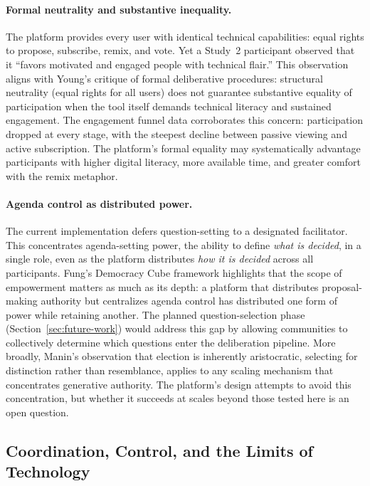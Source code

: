 \documentclass[a4paper, 12pt, twoside]{iviathesis}
\begin{document}
\paragraph{Formal neutrality and substantive inequality.}
The platform provides every user with identical technical capabilities: equal rights to propose, subscribe, remix, and vote. Yet a Study~2 participant observed that it ``favors motivated and engaged people with technical flair.'' This observation aligns with Young's \cite{young2000} critique of formal deliberative procedures: structural neutrality (equal rights for all users) does not guarantee substantive equality of participation when the tool itself demands technical literacy and sustained engagement. The engagement funnel data corroborates this concern: participation dropped at every stage, with the steepest decline between passive viewing and active subscription. The platform's formal equality may systematically advantage participants with higher digital literacy, more available time, and greater comfort with the remix metaphor.

\paragraph{Agenda control as distributed power.}
The current implementation defers question-setting to a designated facilitator. This concentrates agenda-setting power, the ability to define \textit{what is decided}, in a single role, even as the platform distributes \textit{how it is decided} across all participants. Fung's \cite{fung2006} Democracy Cube framework highlights that the scope of empowerment matters as much as its depth: a platform that distributes proposal-making authority but centralizes agenda control has distributed one form of power while retaining another. The planned question-selection phase (Section~\ref{sec:future-work}) would address this gap by allowing communities to collectively determine which questions enter the deliberation pipeline. More broadly, Manin's \cite{manin1997} observation that election is inherently aristocratic, selecting for distinction rather than resemblance, applies to any scaling mechanism that concentrates generative authority. The platform's design attempts to avoid this concentration, but whether it succeeds at scales beyond those tested here is an open question.


\subsection{Coordination, Control, and the Limits of Technology}
\label{sec:coordination-control}
\end{document}
